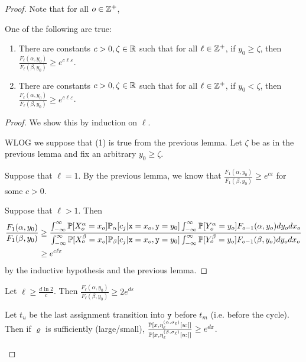 \begin{proof}
Note that for all $o\in \mathbb{Z}^+$, 


\begin{lemma}
	One of the following are true:
	\begin{enumerate}
		\item There are constants $c>0, \zeta\in \mathbb{R}$ such that for all $\ell\in \mathbb{Z}^+$, if $y_0\geq \zeta$, then $\frac{F_\ell(\alpha, y_0)}{F_\ell(\beta, y_0)}\geq e^{c\ell\varepsilon} $.
		\item There are constants $c>0, \zeta\in \mathbb{R}$ such that for all $\ell\in \mathbb{Z}^+$, if $y_0< \zeta$, then $\frac{F_\ell(\alpha, y_0)}{F_\ell(\beta, y_0)}\geq e^{c\ell\varepsilon} $.
	\end{enumerate}
	
\end{lemma}
\begin{proof}
	We show this by induction on $\ell$. 

	WLOG we suppose that (1) is true from the previous lemma. Let $\zeta$ be as in the previous lemma and fix an arbitrary $y_0\geq \zeta$. 

	Suppose that $\ell = 1$. By the previous lemma, we know that $\frac{F_1(\alpha, y_0)}{F_1(\beta, y_0)}\geq e^{c\varepsilon}$ for some $c>0$. 

	Suppose that $\ell >1$. Then \begin{align*}
		\frac{F_1(\alpha, y_0)}{F_1(\beta, y_0)}&\geq \frac{\int_{-\infty}^\infty \mathbb{P}[X_o^\alpha=x_o]\mathbb{P}_\alpha[c_j|\texttt{x}=x_o, \texttt{y} = y_0]\int_{-\infty}^\infty\mathbb{P}[Y_o^{\alpha}=y_o]F_{o-1}(\alpha, y_o)dy_odx_o}{\int_{-\infty}^\infty \mathbb{P}[X_o^\beta=x_o]\mathbb{P}_\beta[c_j|\texttt{x}=x_o, \texttt{y} = y_0]\int_{-\infty}^\infty\mathbb{P}[Y_o^{\beta}=y_o]F_{o-1}(\beta, y_o)dy_odx_o}\\
		&\geq e^{c\ell\varepsilon}
	\end{align*}
	by the inductive hypothesis and the previous lemma. 
\end{proof}

Let $\ell \geq \frac{d\ln 2}{c}$. Then $\frac{F_\ell(\alpha, y_0)}{F_\ell(\beta, y_0)}\geq 2e^{d\varepsilon}$

\begin{lemma}
	Let $t_u$ be the last assignment transition into $\texttt{y}$ before $t_m$ (i.e. before the cycle). Then if $\varrho$ is sufficiently (large/small), $\frac{\mathbb{P}[x, \eta_\ell^{(\alpha, \sigma_\ell)}[u:]]}{\mathbb{P}[x, \eta_\ell^{(\beta, \sigma_\ell)}[u:]]}\geq e^{d\varepsilon}$.
\end{lemma}


\end{proof}
